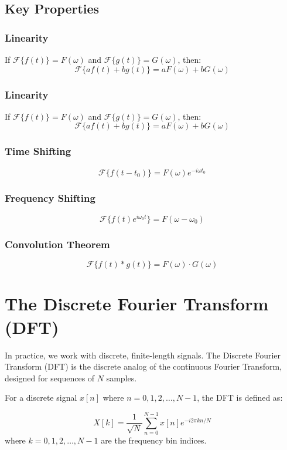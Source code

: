 \documentclass[11pt,a4paper]{article}
\begin{document}
\subsection{Key Properties}

\subsubsection{Linearity}
If $\mathcal{F}\{f(t)\} = F(\omega)$ and $\mathcal{F}\{g(t)\} = G(\omega)$, then:
\[
\mathcal{F}\{af(t) + bg(t)\} = aF(\omega) + bG(\omega)
\]
\subsubsection{Linearity}
If $\mathcal{F}\{f(t)\} = F(\omega)$ and $\mathcal{F}\{g(t)\} = G(\omega)$, then:
\[
\mathcal{F}\{af(t) + bg(t)\} = aF(\omega) + bG(\omega)
\]

\subsubsection{Time Shifting}
\[
\mathcal{F}\{f(t-t_0)\} = F(\omega)e^{-i\omega t_0}
\]

\subsubsection{Frequency Shifting}
\[
\mathcal{F}\{f(t)e^{i\omega_0 t}\} = F(\omega - \omega_0)
\]

\subsubsection{Convolution Theorem}
\[
\mathcal{F}\{f(t) * g(t)\} = F(\omega) \cdot G(\omega)
\]


\section{The Discrete Fourier Transform (DFT)}

In practice, we work with discrete, finite-length signals. The Discrete Fourier Transform (DFT) is the discrete analog of the continuous Fourier Transform, designed for sequences of $N$ samples.

For a discrete signal $x[n]$ where $n = 0, 1, 2, \ldots, N-1$, the DFT is defined as:


\[
X[k] = \frac{1}{\sqrt{N}} \sum_{n=0}^{N-1} x[n] e^{-i 2\pi k n / N}
\]
where $k = 0, 1, 2, \ldots, N-1$ are the frequency bin indices.
\end{document}
